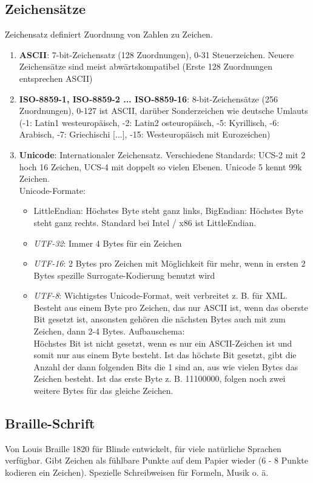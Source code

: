 \documentclass[12pt,landscape]{article}
\begin{document}
\begin{multicols}{3}
\subsection{Zeichensätze}
Zeichensatz definiert Zuordnung von Zahlen zu Zeichen.
\begin{enumerate}
\item \textbf{ASCII}: 7-bit-Zeichensatz (128 Zuordnungen), 0-31 Steuerzeichen. Neuere Zeichensätze sind meist abwärtskompatibel (Erste 128 Zuordnungen entsprechen ASCII)
\item \textbf{ISO-8859-1, ISO-8859-2 ... ISO-8859-16}: 8-bit-Zeichensätze (256 Zuordnungen), 0-127 ist ASCII, darüber Sonderzeichen wie deutsche Umlauts (-1: Latin1 westeuropäisch, -2: Latin2 osteuropäisch, -5: Kyrillisch, -6: Arabisch, -7: Griechischi [...], -15: Westeuropäisch mit Eurozeichen)
\item \textbf{Unicode}: Internationaler Zeichensatz. Verschiedene Standards: UCS-2 mit 2 hoch 16 Zeichen, UCS-4 mit doppelt so vielen Ebenen. Unicode 5 kennt 99k Zeichen.\\
Unicode-Formate:
\begin{itemize}
\item LittleEndian: Höchstes Byte steht ganz links, BigEndian: Höchstes Byte steht ganz rechts. Standard bei Intel / x86 ist LittleEndian.
\item \textit{UTF-32}: Immer 4 Bytes für ein Zeichen
\item \textit{UTF-16}: 2 Bytes pro Zeichen mit Möglichkeit für mehr, wenn in ersten 2 Bytes spezille Surrogate-Kodierung benutzt wird
\item \textit{UTF-8}: Wichtigstes Unicode-Format, weit verbreitet z. B. für XML. Besteht aus einem Byte pro Zeichen, das nur ASCII ist, wenn das oberste Bit gesetzt ist, ansonsten gehören die nächsten Bytes auch mit zum Zeichen, dann 2-4 Bytes. Aufbauschema: \\
Höchstes Bit ist nicht gesetzt, wenn es nur ein ASCII-Zeichen ist und somit nur aus einem Byte besteht. Ist das höchste Bit gesetzt, gibt die Anzahl der dann folgenden Bits die 1 sind an, aus wie vielen Bytes das Zeichen besteht. Ist das erste Byte z. B. 11100000, folgen noch zwei weitere Bytes für das gleiche Zeichen. 
\end{itemize}
\end{enumerate}
\subsection{Braille-Schrift}
Von Louis Braille 1820 für Blinde entwickelt, für viele natürliche Sprachen verfügbar. Gibt Zeichen als fühlbare Punkte auf dem Papier wieder (6 - 8 Punkte kodieren ein Zeichen). Spezielle Schreibweisen für Formeln, Musik o. ä.

\end{multicols}
\end{document}
